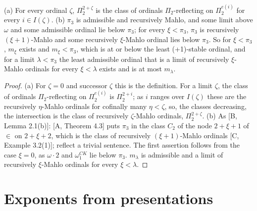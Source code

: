 \documentclass[11pt]{article}
\begin{document}
\begin{statement} (a) For every ordinal $\zeta$, $\Pi_2^{2+\zeta}$ is the class of ordinals
$\Pi_2$-reflecting on $\Pi_2^{e(i)}$ for every $i \in I(\zeta)$. (b) $\pi_3$ is admissible and recursively Mahlo, and some
limit above $\omega$ and some admissible ordinal lie below $\pi_3$; for every $\xi < \pi_3$, $\pi_3$ is recursively
$(\xi+1)$-Mahlo and some recursively $\xi$-Mahlo ordinal lies below $\pi_3$. So for $\xi < \pi_3$, $m_\xi$ exists and
$m_\xi < \pi_3$, which is at or below the least (+1)-stable ordinal, and for a limit $\lambda < \pi_3$ the least
admissible ordinal that is a limit of recursively $\xi$-Mahlo ordinals for every $\xi < \lambda$ exists and is at most
$m_\lambda$.
\end{statement}

\begin{proof}
(a) For $\zeta = 0$ and successor $\zeta$ this is the definition. For a limit $\zeta$, the class of ordinals
$\Pi_2$-reflecting on $\Pi_2^{e(i)}$ is $\Pi_2^{2+i}$; as $i$ ranges over $I(\zeta)$ these are the recursively $\eta$-Mahlo ordinals
for cofinally many $\eta < \zeta$, so, the classes decreasing, the intersection is the class of recursively
$\zeta$-Mahlo ordinals, $\Pi_2^{2+\zeta}$. (b) As [B, Lemma 2.1(b)]: [A, Theorem 4.3] puts $\pi_3$ in the class $C_2$ of
the node $2+\xi+1$ of $\in$ on $2+\xi+2$, which is the class of recursively $(\xi+1)$-Mahlo ordinals [C, Example
3.2(1)]; reflect a trivial sentence. The first assertion follows from the case $\xi = 0$, as $\omega \cdot 2$ and
$\omega_1^{CK}$ lie below $\pi_3$. $m_\lambda$ is admissible and a limit of recursively $\xi$-Mahlo ordinals for every
$\xi < \lambda$.
\end{proof}

\section{Exponents from presentations}
\end{document}
